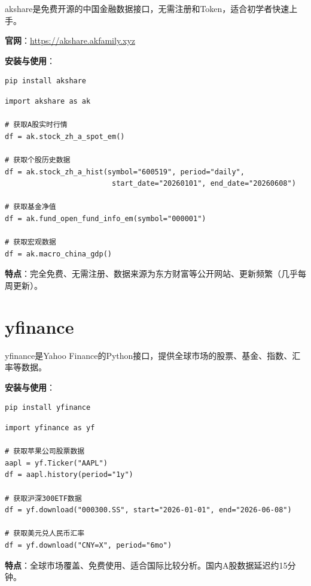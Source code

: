 akshare是免费开源的中国金融数据接口，无需注册和Token，适合初学者快速上手。

\textbf{官网}：\url{https://akshare.akfamily.xyz}

\textbf{安装与使用}：

\begin{lstlisting}[style=shell]
pip install akshare
\end{lstlisting}

\begin{lstlisting}[style=python]
import akshare as ak

# 获取A股实时行情
df = ak.stock_zh_a_spot_em()

# 获取个股历史数据
df = ak.stock_zh_a_hist(symbol="600519", period="daily",
                         start_date="20260101", end_date="20260608")

# 获取基金净值
df = ak.fund_open_fund_info_em(symbol="000001")

# 获取宏观数据
df = ak.macro_china_gdp()
\end{lstlisting}

\textbf{特点}：完全免费、无需注册、数据来源为东方财富等公开网站、更新频繁（几乎每周更新）。

\section{yfinance}

yfinance是Yahoo Finance的Python接口，提供全球市场的股票、基金、指数、汇率等数据。

\textbf{安装与使用}：

\begin{lstlisting}[style=shell]
pip install yfinance
\end{lstlisting}

\begin{lstlisting}[style=python]
import yfinance as yf

# 获取苹果公司股票数据
aapl = yf.Ticker("AAPL")
df = aapl.history(period="1y")

# 获取沪深300ETF数据
df = yf.download("000300.SS", start="2026-01-01", end="2026-06-08")

# 获取美元兑人民币汇率
df = yf.download("CNY=X", period="6mo")
\end{lstlisting}

\textbf{特点}：全球市场覆盖、免费使用、适合国际比较分析。国内A股数据延迟约15分钟。

